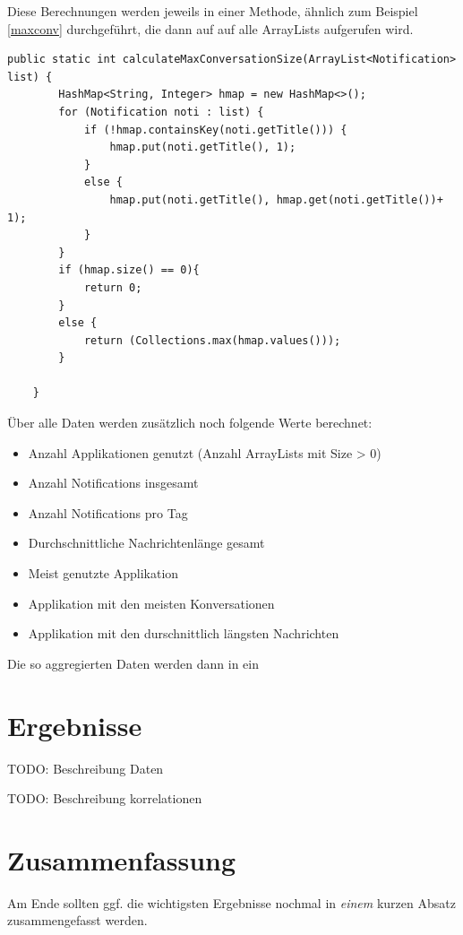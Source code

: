 Diese Berechnungen werden jeweils in einer Methode, ähnlich zum Beispiel \ref{maxconv} durchgeführt, die dann auf auf alle ArrayLists aufgerufen wird.


\begin{lstlisting}[frame=single, caption =  calculateMaxConversationSize(), label=maxconv] 
    public static int calculateMaxConversationSize(ArrayList<Notification> list) {
        HashMap<String, Integer> hmap = new HashMap<>();
        for (Notification noti : list) {
            if (!hmap.containsKey(noti.getTitle())) {
                hmap.put(noti.getTitle(), 1);
            }
            else {
                hmap.put(noti.getTitle(), hmap.get(noti.getTitle())+ 1);
            }
        }
        if (hmap.size() == 0){
            return 0;
        }
        else {
            return (Collections.max(hmap.values()));
        }

    }
\end{lstlisting}


Über alle Daten werden zusätzlich noch folgende Werte berechnet:

\begin{itemize}
  \item Anzahl Applikationen genutzt (Anzahl ArrayLists mit Size > 0)
  \item Anzahl Notifications insgesamt
  \item Anzahl Notifications pro Tag
  \item Durchschnittliche Nachrichtenlänge gesamt
  \item Meist genutzte Applikation
  \item Applikation mit den meisten Konversationen
  \item Applikation mit den durschnittlich längsten Nachrichten  
\end{itemize}

Die so aggregierten Daten werden dann in ein 

\section{Ergebnisse}

TODO: Beschreibung Daten
\par
TODO: Beschreibung korrelationen


\section{Zusammenfassung}
\label{ch:Evaluierung:sec:zusammenfassung}

Am Ende sollten ggf. die wichtigsten Ergebnisse nochmal in \emph{einem}
kurzen Absatz zusammengefasst werden.

